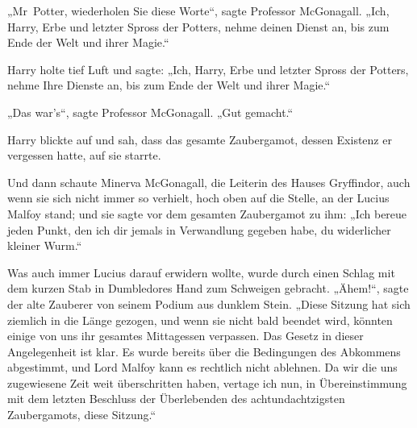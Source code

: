 „Mr~Potter, wiederholen Sie diese Worte“, sagte Professor McGonagall. „Ich, Harry, Erbe und letzter Spross der Potters, nehme deinen Dienst an, bis zum Ende der Welt und ihrer Magie.“

Harry holte tief Luft und sagte: „Ich, Harry, Erbe und letzter Spross der Potters, nehme Ihre Dienste an, bis zum Ende der Welt und ihrer Magie.“

„Das war’s“, sagte Professor McGonagall. „Gut gemacht.“

Harry blickte auf und sah, dass das gesamte Zaubergamot, dessen Existenz er vergessen hatte, auf sie starrte.

Und dann schaute Minerva McGonagall, die Leiterin des Hauses Gryffindor, auch wenn sie sich nicht immer so verhielt, hoch oben auf die Stelle, an der Lucius Malfoy stand; und sie sagte vor dem gesamten Zaubergamot zu ihm: „Ich bereue jeden Punkt, den ich dir jemals in Verwandlung gegeben habe, du widerlicher kleiner Wurm.“

Was auch immer Lucius darauf erwidern wollte, wurde durch einen Schlag mit dem kurzen Stab in Dumbledores Hand zum Schweigen gebracht. „Ähem!“, sagte der alte Zauberer von seinem Podium aus dunklem Stein. „Diese Sitzung hat sich ziemlich in die Länge gezogen, und wenn sie nicht bald beendet wird, könnten einige von uns ihr gesamtes Mittagessen verpassen. Das Gesetz in dieser Angelegenheit ist klar. Es wurde bereits über die Bedingungen des Abkommens abgestimmt, und Lord Malfoy kann es rechtlich nicht ablehnen. Da wir die uns zugewiesene Zeit weit überschritten haben, vertage ich nun, in Übereinstimmung mit dem letzten Beschluss der Überlebenden des achtundachtzigsten Zaubergamots, diese Sitzung.“

